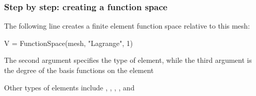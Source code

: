 \begin{frame}[fragile]
  \frametitle{Step by step: creating a function space}

  The following line creates a finite element function space relative to this mesh:
\vspace{-1em}
\begin{python}
V = FunctionSpace(mesh, "Lagrange", 1)
\end{python}

  \bigskip

  The second argument specifies the type of element, while the third
  argument is the degree of the basis functions on the element

  \bigskip

  Other types of elements include
  ,
  ,
  ,
  ,
   and

\end{frame}
